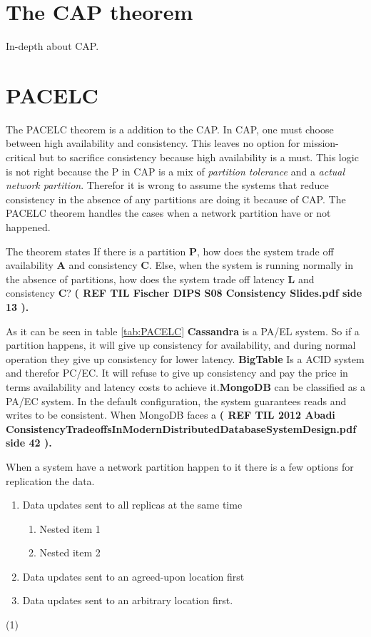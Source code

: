 \section{The CAP theorem}

In-depth about CAP.

\section{PACELC}
The PACELC theorem is a addition to the CAP. In CAP, one must choose between high availability and consistency. This leaves no option for mission-critical but to sacrifice consistency because high availability is a must. This logic is not right because the P in CAP is a mix of \textit{partition tolerance} and a \textit{actual network partition}. Therefor it is wrong to assume the systems that reduce consistency in the absence of any partitions are doing it because of CAP. The PACELC theorem handles the cases when a network partition have or not happened.

The theorem states If there is a partition \textbf{P}, how does the system trade off availability \textbf{A} and consistency \textbf{C}. Else, when the system is running normally in
the absence of partitions, how does the system trade off latency \textbf{L}
and consistency \textbf{C}? \textbf{( REF TIL Fischer DIPS S08 Consistency Slides.pdf side 13 ).}


As it can be seen in table \ref{tab:PACELC} \textbf{Cassandra} is a PA/EL system. So if a partition happens, it will give up consistency for availability, and during normal operation they give up consistency for lower latency. \textbf{BigTable}
Is a ACID system and therefor PC/EC. It will refuse to give up consistency and pay the price in terms availability and latency costs to achieve it.\textbf{MongoDB} can be classified as a PA/EC system. In the default configuration, the system guarantees reads and writes to be consistent. When MongoDB faces a  \textbf{( REF TIL 2012 Abadi ConsistencyTradeoffsInModernDistributedDatabaseSystemDesign.pdf side 42 ).}


When a system have a network partition happen to it there is a few options for replication the data.


\begin{enumerate}
	\item Data updates sent to all replicas at the same time
	\begin{enumerate}
		\item Nested item 1
		\item Nested item 2
	\end{enumerate}
	\item Data updates sent to an agreed-upon location first
	\item Data updates sent to an arbitrary location first.
\end{enumerate}
(1) 



